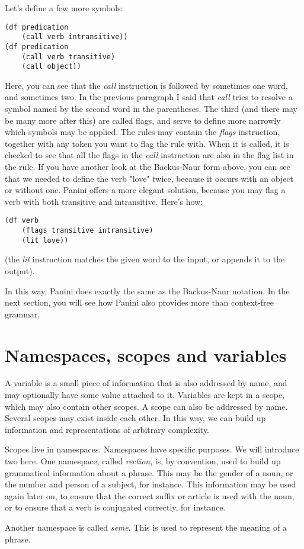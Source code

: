 \documentclass{article}
\begin{document}
Let's define a few more symbols:
\begin{lstlisting}
(df predication
	(call verb intransitive))
(df predication
	(call verb transitive)
	(call object))
\end{lstlisting}
Here, you can see that the \emph{call} instruction is followed by sometimes one word, and sometimes two. In the previous paragraph I
said that \emph{call} tries to resolve a symbol named by the second word in the parentheses. The third (and there may be many more
after this) are called flags, and serve to define more narrowly which symbols may be applied. The rules may contain the \emph{flags} 
instruction, together with any token you want to flag the rule with. When it is called, it is checked to see that all the flags in 
the \emph{call} instruction are also in the flag list in the rule. If you have another look at the Backus-Naur form above, you can 
see that we needed to define the verb "love" twice, because it occurs with an object or without one. 
Panini offers a more elegant solution, because you may flag a verb with both transitive and intransitive. Here's how:
\begin{lstlisting}
(df verb
	(flags transitive intransitive)
	(lit love))
\end{lstlisting}
(the \emph{lit} instruction matches the given word to the input, or appends it to the output).

In this way, Panini does exactly the same as the Backus-Naur notation. In the next section, you will see how Panini also provides
more than context-free grammar.

\section{Namespaces, scopes and variables}
A variable is a small piece of information that is also addressed by name, and may optionally have some value attached to it. 
Variables are kept in a scope, which may also contain other scopes. A scope can also be addressed by name. Several scopes may exist
inside each other. In this way, we can build up information and representations of arbitrary complexity.

Scopes live in namespaces. Namespaces have specific purposes. We will introduce two here. One namespace, called \emph{rection}, is,
by convention, used to build up grammatical information about a phrase. This may be the gender of a noun, or the number and person
of a subject, for instance. This information may be used again later on, to ensure that the correct suffix or article is used with
the noun, or to ensure that a verb is conjugated correctly, for instance.

Another namespace is called \emph{seme}. This is used to represent the meaning of a phrase.


\label{end}
\end{document}
